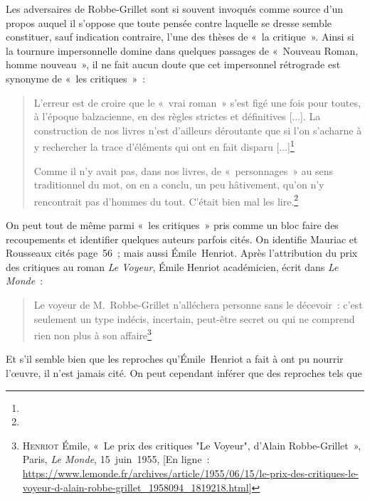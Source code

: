 \documentclass[12pt, a4paper]{article}
\begin{document}
Les adversaires de Robbe-Grillet sont si souvent invoqués comme source d'un propos auquel il s'oppose que toute pensée contre laquelle se dresse \robbe{} semble constituer, sauf indication contraire, l'une des thèses de «~la critique~». Ainsi si la tournure impersonnelle domine dans quelques passages de «~Nouveau Roman, homme nouveau~», il ne fait aucun doute que cet impersonnel rétrograde est synonyme de «~les critiques~»~:
\begin{quote}
    L'erreur est de croire que le «~vrai roman~» s’est figé une fois pour toutes, à l’époque balzacienne, en des règles strictes et définitives [...]. La construction de nos livres n’est d’ailleurs déroutante que si l’on s’acharne à y rechercher la trace d’éléments qui ont en fait disparu [...]\footnote{}

    Comme il n’y avait pas, dans nos livres, de «~personnages~» au sens traditionnel du mot, on en a conclu, un peu hâtivement, qu’on n’y rencontrait pas d’hommes du tout. C’était bien mal les lire.\footnote{}
\end{quote}

On peut tout de même parmi «~les critiques~» pris comme un bloc faire des recoupements et identifier quelques auteurs parfois cités.
On identifie Mauriac et Rousseaux cités page~56~; mais aussi Émile~Henriot. Après l'attribution du prix des critiques au roman \textit{Le Voyeur}, Émile Henriot académicien, écrit dans \textit{Le Monde}~:
\begin{quote}
    Le voyeur de M.~Robbe-Grillet n'alléchera personne sans le décevoir~: c'est seulement un type indécis, incertain, peut-être secret ou qui ne comprend rien non plus à son affaire\footnote{\textsc{Henriot} Émile, «~Le prix des critiques "Le Voyeur", d'Alain Robbe-Grillet~», Paris, \textit{Le Monde}, 15~juin~1955, [En ligne~: \href{https://www.lemonde.fr/archives/article/1955/06/15/le-prix-des-critiques-le-voyeur-d-alain-robbe-grillet_1958094_1819218.html}{https://www.lemonde.fr/archives/article/1955/06/15/le-prix-des-critiques-le-voyeur-d-alain-robbe-grillet\_1958094\_1819218.html}]}
\end{quote}
Et s'il semble bien que les reproches qu'Émile~Henriot a fait à \robbe{} ont pu nourrir l'œuvre, il n'est jamais cité. On peut cependant inférer que des reproches tels que 
\end{document}
